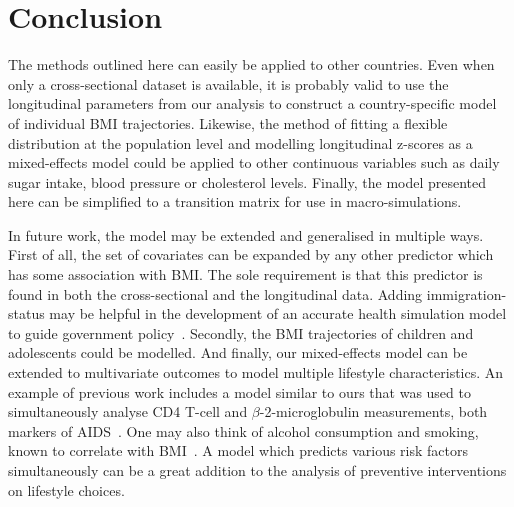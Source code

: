 \documentclass{imammb}
\numberwithin{equation}{section}
\begin{document}
\section{Conclusion}
\label{sec:Conclusion}

The methods outlined here can easily be applied to other countries. Even when only a cross-sectional dataset is available, it is probably valid to use the longitudinal parameters from our analysis to construct a country-specific model of individual BMI trajectories. Likewise, the method of fitting a flexible distribution at the population level and modelling longitudinal z-scores as a mixed-effects model could be applied to other continuous variables such as daily sugar intake, blood pressure or cholesterol levels. Finally, the model presented here can be simplified to a transition matrix for use in macro-simulations.

In future work, the model may be extended and generalised in multiple ways. First of all, the set of covariates can be expanded by any other predictor which has some association with BMI. The sole requirement is that this predictor is found in both the cross-sectional and the longitudinal data. Adding immigration-status may be helpful in the development of an accurate health simulation model to guide government policy~\citep{TenDam2023}. Secondly, the BMI trajectories of children and adolescents could be modelled. And finally, our mixed-effects model can be extended to multivariate outcomes to model multiple lifestyle characteristics. An example of previous work includes a model similar to ours that was used to simultaneously analyse CD4 T-cell and $\beta$-2-microglobulin measurements, both markers of AIDS~\citep{Sy1997}. One may also think of alcohol consumption and smoking, known to correlate with BMI~\citep{Chiolero2008, Traversy2015}. A model which predicts various risk factors simultaneously can be a great addition to the analysis of preventive interventions on lifestyle choices.

\vspace*{6pt}

\nocite{*}


\end{document}
